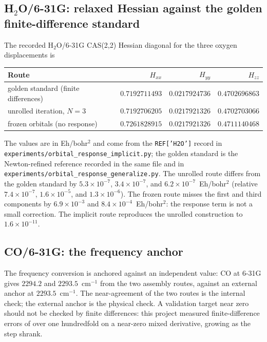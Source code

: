 \subsection{H\texorpdfstring{$_2$}{2}O/6-31G: relaxed Hessian against
the golden finite-difference standard}

The recorded H$_2$O/6-31G CAS(2,2) Hessian diagonal for the three
oxygen displacements is
\begin{center}
\small
\begin{tabular}{lrrr}
\toprule
Route & $H_{xx}$ & $H_{yy}$ & $H_{zz}$ \\
\midrule
golden standard (finite differences) & $0.7192711493$ & $0.0217924736$ & $0.4702696863$ \\
unrolled iteration, $N=3$ & $0.7192706205$ & $0.0217921326$ & $0.4702703066$ \\
frozen orbitals (no response) & $0.7261828915$ & $0.0217921326$ & $0.4711140468$ \\
\bottomrule
\end{tabular}
\end{center}
{\raggedright
The values are in Eh/bohr$^{2}$ and come from the \texttt{REF['H2O']}
record in \texttt{experiments/orbital\_response\_implicit.py}; the
golden standard is the Newton-refined reference recorded in the same
file and in \texttt{experiments/orbital\_response\_generalize.py}.  The
unrolled route differs from the golden standard by
$5.3\times10^{-7}$, $3.4\times10^{-7}$, and $6.2\times10^{-7}$~Eh/bohr$^2$
(relative $7.4\times10^{-7}$, $1.6\times10^{-5}$, and
$1.3\times10^{-6}$).  The frozen route misses the first and third
components by $6.9\times10^{-3}$ and $8.4\times10^{-4}$~Eh/bohr$^2$:
the response term is not a small correction.  The implicit route
reproduces the unrolled construction to $1.6\times10^{-11}$.\par}

\subsection{CO/6-31G: the frequency anchor}

The frequency conversion is anchored against an independent value: CO
at 6-31G gives $2294.2$ and $2293.5$~cm$^{-1}$ from the two assembly
routes, against an external anchor at $2293.5$~cm$^{-1}$.  The
near-agreement of the two routes is the internal check; the external
anchor is the physical check.  A validation target near zero should not
be checked by finite differences: this project measured
finite-difference errors of over one hundredfold on a near-zero mixed
derivative, growing as the step shrank.

